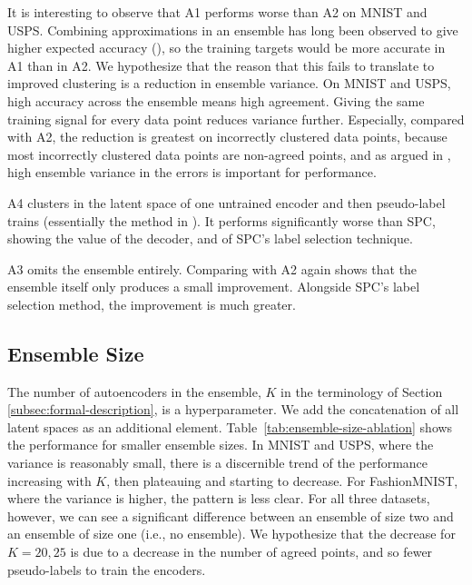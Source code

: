 \documentclass[runningheads]{llncs}
\begin{document}
It is interesting to observe that A1 performs worse than A2 on MNIST and USPS. Combining approximations in an ensemble has long been observed to give higher expected accuracy (\cite{clemen1989combining,pearlmutter1991chaitin,perrone1993improving,breiman1996bagging}), so the training targets would be more accurate in A1 than in A2. We hypothesize that the reason that this fails to translate to improved clustering is a reduction in ensemble variance. On MNIST and USPS, high accuracy across the ensemble means high agreement. Giving the same training signal for every data point reduces variance further. Especially, compared with A2,  the reduction is greatest on incorrectly clustered data points, because most incorrectly clustered data points are non-agreed points, and as argued in \cite{kittler1998combining}, high ensemble variance in the errors is important for performance. 

A4 clusters in the latent space of one untrained encoder and then pseudo-label trains (essentially the method  in \cite{caron2018deep}). It performs significantly worse than SPC, showing the value of the decoder, and of SPC's label selection technique.

A3 omits the ensemble entirely. Comparing with A2 again shows that the ensemble itself only produces a small improvement. Alongside SPC's label selection method, the improvement is much greater.


\subsection{Ensemble Size}
 The number of autoencoders in the ensemble, $K$ in the terminology of Section \ref{subsec:formal-description}, is a hyperparameter. We add the concatenation of all latent spaces as an additional element. Table~\ref{tab:ensemble-size-ablation} shows the performance for smaller ensemble sizes. In MNIST and USPS, where the variance is reasonably small, there is a discernible trend of the performance increasing with $K$, then plateauing and starting to decrease. For FashionMNIST, where the variance is higher, the pattern is less clear. For all three datasets, however, we can see a significant difference between an ensemble of size two and an ensemble of size one (i.e., no ensemble). We hypothesize that the decrease for $K=20,25$ is due to a decrease in the number of agreed points, and so fewer pseudo-labels to train the encoders. 
 
\end{document}
